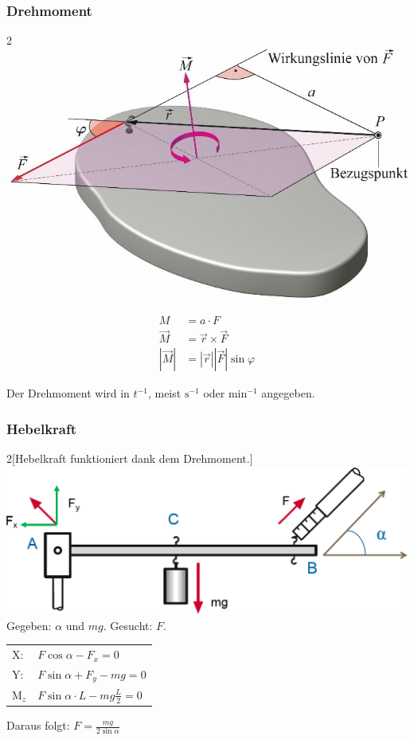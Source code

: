 \documentclass[a4paper]{scrartcl}
\begin{document}
\subsubsection{Drehmoment}\label{sec:drehmoment}
	\begin{multicols}{2}
		\includegraphics[width=0.9\linewidth]{img/drehmoment}
		
		\begin{align*}
		M &= a \cdot F \\
		\vec{M} &= \vec{r} \times \vec{F} \\
		\left| \vec{M} \right| &= \left| \vec{r} \right| \left| \vec{F} \right| \sin \varphi
		\end{align*}
		
		Der Drehmoment wird in $t^{-1}$, meist $\text{s}^{-1}$ oder $\text{min}^{-1}$ angegeben.
	\end{multicols}

\subsubsection{Hebelkraft}
	\begin{multicols}{2}[Hebelkraft funktioniert dank dem Drehmoment.]
		\includegraphics[width=\linewidth]{img/hebelkraft}
		Gegeben: $\alpha$ und $mg$. Gesucht: $F$.
		
		\begin{tabu}{l X}
			X: & $F \cos \alpha - F_x = 0$\\
			Y: & $F \sin \alpha + F_y - mg = 0$\\
			M$_z$ & $F \sin \alpha \cdot L - mg \frac{L}{2} = 0$
		\end{tabu}
		Daraus folgt: $F = \frac{mg}{2 \sin \alpha}$
	\end{multicols}
\end{document}
